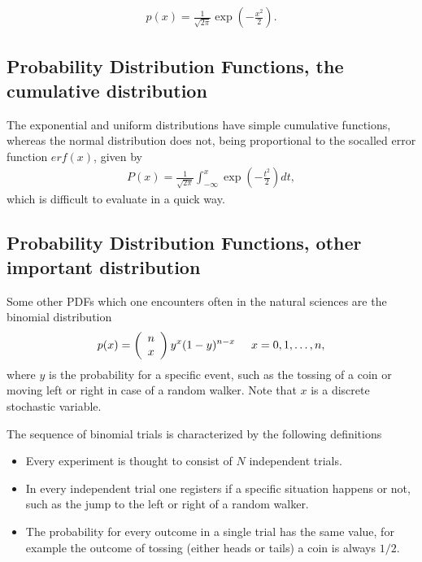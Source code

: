 \documentclass[letterpaper,10pt,english]{sphinxmanual}
\begin{document}
\begin{equation*}
\begin{split}
\begin{equation}
   p(x)=\frac{1}{\sqrt{2\pi}}\exp{\left(-\frac{x^2}{2}\right)}.
\label{_auto1} \tag{3}
\end{equation}
\end{split}
\end{equation*}

\subsection{Probability Distribution Functions, the cumulative distribution}
\label{\detokenize{chapter3:probability-distribution-functions-the-cumulative-distribution}}
The exponential and uniform distributions have simple cumulative functions,
whereas the normal distribution does not, being proportional to the so\sphinxhyphen{}called
error function \(erf(x)\), given by
\begin{equation*}
\begin{split}
P(x) = \frac{1}{\sqrt{2\pi}}\int_{-\infty}^x\exp{\left(-\frac{t^2}{2}\right)}dt,
\end{split}
\end{equation*}
which is difficult to evaluate in a quick way.


\subsection{Probability Distribution Functions, other important distribution}
\label{\detokenize{chapter3:probability-distribution-functions-other-important-distribution}}
Some other PDFs which one encounters often in the natural sciences are the binomial distribution
\begin{equation*}
\begin{split}
p(x) = \left(\begin{array}{c} n \\ x\end{array}\right)y^x(1-y)^{n-x} \hspace{0.5cm}x=0,1,\dots,n,
\end{split}
\end{equation*}
where \(y\) is the probability for a specific event, such as the tossing of a coin or moving left or right
in case of a random walker. Note that \(x\) is a discrete stochastic variable.

The sequence of binomial trials is characterized by the following definitions
\begin{itemize}
\item {} 
Every experiment is thought to consist of \(N\) independent trials.

\item {} 
In every independent trial one registers if a specific situation happens or not, such as the  jump to the left or right of a random walker.

\item {} 
The probability for every outcome in a single trial has the same value, for example the outcome of tossing (either heads or tails) a coin is always \(1/2\).

\end{itemize}
\end{document}
